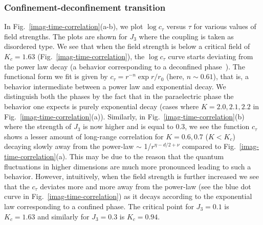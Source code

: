 \subsubsection{Confinement-deconfinement transition}
\indent \indent In Fig.~\ref{imag-time-correlation}(a-b), we plot $\log c_\tau$ versus $\tau$ for various values of field strengths. The plots are shown for $J_3$ where the coupling is taken as disordered type. We see that when the field strength is below a critical field of $K_c=1.63$ (Fig.~\ref{imag-time-correlation}), the $\log c_\tau$ curve starts deviating from the power law decay (a behavior corresponding to a deconfined phase~\cite{chern2014gauge}). The functional form we fit is given by $c_\tau=r^{-n}\exp{r/r_0}$ (here, $n\sim 0.61$), that is, a behavior intermediate between a power law and exponential decay. We distinguish both the phases by the fact that in the paraelectric phase the behavior one expects is purely exponential decay (cases where $K=2.0,2.1,2.2$ in Fig.~\ref{imag-time-correlation}(a)). Similarly, in Fig.~\ref{imag-time-correlation}(b) where the strength of $J_3$ is now higher and is equal to 0.3, we see the function $c_\tau$ shows a lesser amount of long-range correlation for $K=0.6,0.7$ ($K<K_c$) decaying slowly away from the power-law $\sim$ 1/$r^{\eta-d/2+\nu}$ compared to Fig.~\ref{imag-time-correlation}(a). This may be due to the reason that the quantum fluctuations in higher dimensions are much more pronounced leading to such a behavior.  However, intuitively, when the field strength is further increased we see that the $c_\tau$ deviates more and more away from the power-law (see the blue dot curve in Fig.~\ref{imag-time-correlation}) as it decays according to the exponential law corresponding to a confined phase. The critical point for $J_3=0.1$ is $K_c=1.63$ and similarly for $J_3=0.3$ is $K_c=0.94$.  \\
